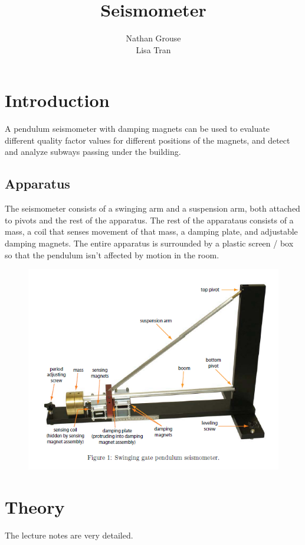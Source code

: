 \documentclass[12pt]{article}
\title{Seismometer}
\author{Nathan Grouse\\Lisa Tran}
\begin{document}
\maketitle

\section{Introduction}
\indent \indent A pendulum seismometer with damping magnets can be used to evaluate different quality factor values for different positions of the magnets, and detect and analyze subways passing under the building.

\subsection{Apparatus}
\indent \indent The seismometer consists of a swinging arm and a suspension arm, both attached to pivots and the rest of the apparatus. The rest of the apparataus consists of a mass, a coil that senses movement of that mass, a damping plate, and adjustable damping magnets. The entire apparatus is surrounded by a plastic screen / box so that the pendulum isn't affected by motion in the room.

\begin{figure}[H]
\centering
\hspace{-0.0in}\includegraphics[scale=0.90]{apparatus.png}
\end{figure}

\section{Theory}
\indent \indent The lecture notes are very detailed.
\end{document}
